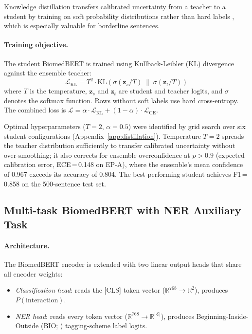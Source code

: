 \documentclass[11pt]{article}
\begin{document}
Knowledge distillation \citep{hinton2015distilling} transfers calibrated
uncertainty from a teacher to a student by training on soft probability
distributions rather than hard labels \citep{bucilua2006model}, which is
especially valuable for borderline sentences.

\paragraph{Training objective.}
The student BiomedBERT is trained using Kullback-Leibler (KL) divergence
against the ensemble teacher:
\begin{equation}
    \mathcal{L}_\text{KL} = T^2 \cdot \mathrm{KL}\!\left(
        \sigma(\mathbf{z}_s / T) \;\|\; \sigma(\mathbf{z}_t / T)
    \right)
\end{equation}
where $T$ is the temperature, $\mathbf{z}_s$ and $\mathbf{z}_t$ are student
and teacher logits, and $\sigma$ denotes the softmax function.
Rows without soft labels use hard cross-entropy. The combined loss is
$\mathcal{L} = \alpha \cdot \mathcal{L}_\text{KL} + (1{-}\alpha) \cdot \mathcal{L}_\text{CE}$.

Optimal hyperparameters ($T{=}2$, $\alpha{=}0.5$) were identified by
grid search over six student configurations (Appendix~\ref{app:distillation}).
Temperature $T{=}2$ spreads the teacher distribution sufficiently to
transfer calibrated uncertainty without over-smoothing; it also corrects
for ensemble overconfidence at $p{>}0.9$ (expected calibration error,
ECE\,=\,0.148 on EP-A),
where the ensemble's mean confidence of 0.967 exceeds its accuracy of 0.804. The best-performing
student achieves F1\,=\,0.858 on the 500-sentence test set.

\subsection{Multi-task BiomedBERT with NER Auxiliary Task}
\label{sec:multitask}

\paragraph{Architecture.}
The BiomedBERT encoder is extended with two linear output heads that share
all encoder weights:
\begin{itemize}
    \item \textit{Classification head}: reads the [CLS] token vector
    ($\mathbb{R}^{768} \to \mathbb{R}^2$), produces $P(\text{interaction})$.
    \item \textit{NER head}: reads every token vector
    ($\mathbb{R}^{768} \to \mathbb{R}^{|\mathcal{L}|}$), produces
    Beginning-Inside-Outside (BIO; \citealt{ramshaw1995text}) tagging-scheme
    label logits.
\end{itemize}
\end{document}
